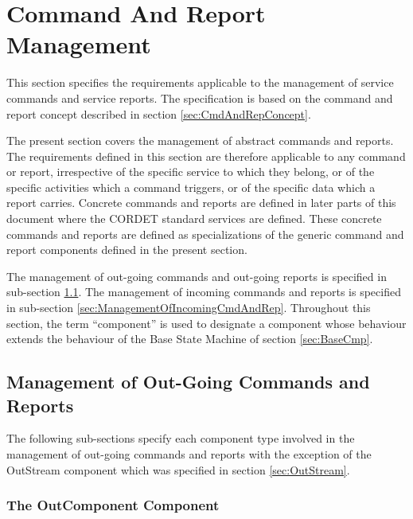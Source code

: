 \documentclass{pnp_article}
\begin{document}
\section{Command And Report Management}\label{sec:CmdAndRepManagement}

This section specifies the requirements applicable to the management of service commands and service reports. The specification is based on the command and report concept described in section \ref{sec:CmdAndRepConcept}. 

The present section covers the management of abstract commands and reports. The requirements defined in this section are therefore applicable to any command or report, irrespective of the specific service to which they belong, or of the specific activities which a command triggers, or of the specific data which a report carries. Concrete commands and reports are defined in later parts of this document where the CORDET standard services are defined. These concrete commands and reports are defined as specializations of the generic command and report components defined in the present section. 

The management of out-going commands and out-going reports is specified in sub-section \ref{sec:ManagementOfOutGoingCmdAndRep}. The management of incoming commands and reports is specified in sub-section \ref{sec:ManagementOfIncomingCmdAndRep}. Throughout this section, the term “component” is used to designate a component whose behaviour extends the behaviour of the Base State Machine of section \ref{sec:BaseCmp}. 

\subsection{Management of Out-Going Commands and Reports}\label{sec:ManagementOfOutGoingCmdAndRep}
 

The following sub-sections specify each component type involved in the management of out-going commands and reports with the exception of the OutStream component which was specified in section \ref{sec:OutStream}. 

\subsubsection{The OutComponent Component}\label{sec:OutComponent}
 
\end{document}
